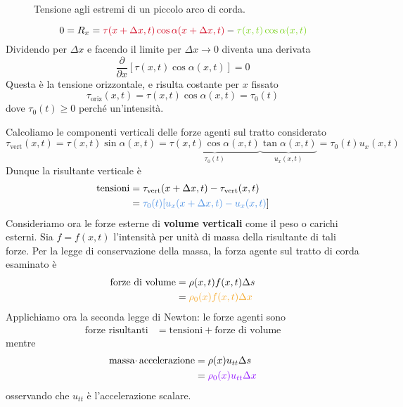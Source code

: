 \documentclass[10pt,a4paper,twoside,openright]{book}
\begin{document}
\begin{figure}[htpb]
\begin{tikzpicture}[x=0.75pt,y=0.75pt,yscale=-1,xscale=1]
	\end{tikzpicture}
	\caption{Tensione agli estremi di un piccolo arco di corda.}
\end{figure}
\FloatBarrier



\begin{equation*}
0=R_{x} =\textcolor[rgb]{0.82,0.01,0.11}{\tau (x+\Delta x,t)\cos \alpha (x+\Delta x,t)} -\textcolor[rgb]{0.49,0.83,0.13}{\tau (x,t)\cos \alpha (x,t)}
\end{equation*}
Dividendo per $\displaystyle \Delta x$ e facendo il limite per $\displaystyle \Delta x\rightarrow 0$ diventa una derivata
\begin{equation*}
\frac{\partial }{\partial x}[ \tau (x,t)\cos \alpha (x,t)] =0
\end{equation*}
Questa è la tensione orizzontale, e risulta costante per $x$ fissato
\begin{equation*}
\tau _{\text{oriz}}(x,t) =\tau (x,t)\cos \alpha (x,t) =\tau _{0}(t)
\end{equation*}
dove $\displaystyle \tau _{0}(t) \geqslant 0$ perché un'intensità.

Calcoliamo le componenti verticali delle forze agenti sul tratto considerato
\begin{equation*}
\tau _{\text{vert}}(x,t) =\tau (x,t)\sin \alpha (x,t) =\underbrace{\tau (x,t)\cos \alpha (x,t)}_{\tau _{0}(t)}\underbrace{\tan \alpha (x,t)}_{u_{x}(x,t)} =\tau _{0}(t) u_{x}(x,t)
\end{equation*}
Dunque la risultante verticale è
\begin{align*}
\text{tensioni} & =\tau _{\text{vert}}(x+\Delta x,t) -\tau _{\text{vert}}(x,t)\\
 & =\textcolor[rgb]{0.29,0.56,0.89}{\tau _{0}(t)[ u_{x}(x+\Delta x,t) -u_{x}(x,t)}]
\end{align*}
Consideriamo ora le forze esterne di \textbf{volume} \textbf{verticali} come il peso o carichi esterni. Sia $\displaystyle f=f(x,t)$ l'intensità per unità di massa della risultante di tali forze. Per la legge di conservazione della massa, la forza agente sul tratto di corda esaminato è
\begin{align*}
\text{forze di volume} & =\rho (x,t) f(x,t) \Delta s\\
 & =\textcolor[rgb]{0.96,0.65,0.14}{\rho _{0}(x) f(x,t) \Delta x}
\end{align*}
Applichiamo ora la seconda legge di Newton: le forze agenti sono
\begin{align*}
\text{forze risultanti} & =\text{tensioni} +\text{forze di volume}
\end{align*}
mentre
\begin{align*}
\text{massa} \cdotp \text{accelerazione} & =\rho (x) u_{tt} \Delta s\\
 & =\textcolor[rgb]{0.56,0.07,1}{\rho _{0}(x) u_{tt} \Delta x}
\end{align*}
osservando che $\displaystyle u_{tt}$ è l'accelerazione scalare.
\end{document}
